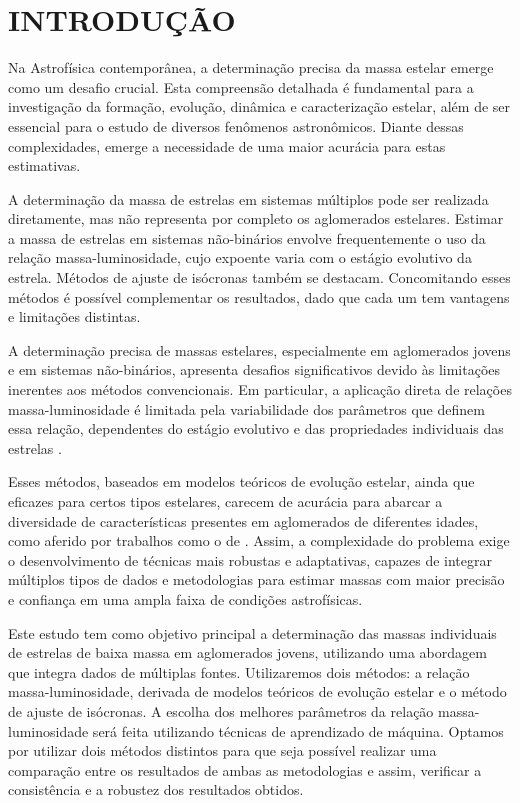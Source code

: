 
\chapter{\textbf{INTRODUÇÃO}}
    Na Astrofísica contemporânea, a determinação precisa da massa estelar emerge como um desafio crucial. Esta compreensão detalhada é fundamental para a investigação da formação, evolução, dinâmica e caracterização estelar, além de ser essencial para o estudo de diversos fenômenos astronômicos. Diante dessas complexidades, emerge a necessidade de uma maior acurácia para estas estimativas.
    
    A determinação da massa de estrelas em sistemas múltiplos pode ser realizada diretamente, mas não representa por completo os aglomerados estelares. Estimar a massa de estrelas em sistemas não-binários envolve frequentemente o uso da relação massa-luminosidade, cujo expoente varia com o estágio evolutivo da estrela. Métodos de ajuste de isócronas também se destacam. Concomitando esses métodos é possível complementar os resultados, dado que cada um tem vantagens e limitações distintas.
    
    A determinação precisa de massas estelares, especialmente em aglomerados jovens e em sistemas não-binários, apresenta desafios significativos devido às limitações inerentes aos métodos convencionais. Em particular, a aplicação direta de relações massa-luminosidade é limitada pela variabilidade dos parâmetros que definem essa relação, dependentes do estágio evolutivo e das propriedades individuais das estrelas \cite{moya2018empirical}.
    
    Esses métodos, baseados em modelos teóricos de evolução estelar, ainda que eficazes para certos tipos estelares, carecem de acurácia para abarcar a diversidade de características presentes em aglomerados de diferentes idades, como aferido por trabalhos como o de . Assim, a complexidade do problema exige o desenvolvimento de técnicas mais robustas e adaptativas, capazes de integrar múltiplos tipos de dados e metodologias para estimar massas com maior precisão e confiança em uma ampla faixa de condições astrofísicas.
    
    Este estudo tem como objetivo principal a determinação das massas individuais de estrelas de baixa massa em aglomerados jovens, utilizando uma abordagem que integra dados de múltiplas fontes.
    Utilizaremos dois métodos: a relação massa-luminosidade, derivada de modelos teóricos de evolução estelar e o método de ajuste de isócronas. A escolha dos melhores parâmetros da relação massa-luminosidade será feita utilizando técnicas de aprendizado de máquina. Optamos por utilizar dois métodos distintos para que seja possível realizar uma comparação entre os resultados de ambas as metodologias e assim, verificar a consistência e a robustez dos resultados obtidos.
  
